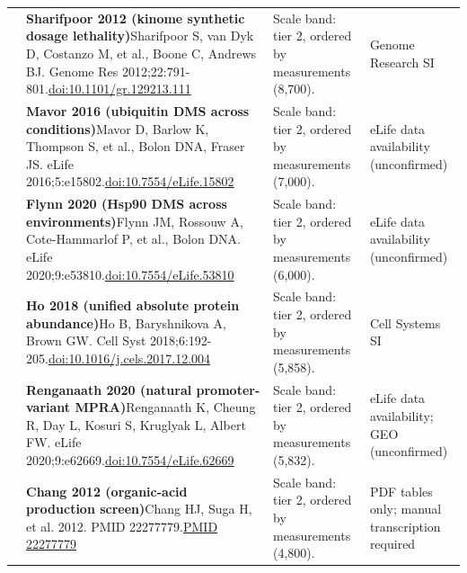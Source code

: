\begin{landscape}
\begin{longtable}{@{}r@{\hspace{4pt}} L{86mm} L{92mm} L{62mm}@{}}
 & \textbf{Sharifpoor 2012 (kinome synthetic dosage lethality)}\newline Sharifpoor S, van Dyk D, Costanzo M, et al., Boone C, Andrews BJ. Genome Res 2012;22:791-801.\newline \href{https://doi.org/10.1101/gr.129213.111}{doi:10.1101/\allowbreak gr.129213.111} & Scale band: tier 2, ordered by measurements (8,700). & Genome Research SI \\
 & \textbf{Mavor 2016 (ubiquitin DMS across conditions)}\newline Mavor D, Barlow K, Thompson S, et al., Bolon DNA, Fraser JS. eLife 2016;5:e15802.\newline \href{https://doi.org/10.7554/eLife.15802}{doi:10.7554/\allowbreak eLife.15802} & Scale band: tier 2, ordered by measurements (7,000). & eLife data availability (unconfirmed) \\
 & \textbf{Flynn 2020 (Hsp90 DMS across environments)}\newline Flynn JM, Rossouw A, Cote-Hammarlof P, et al., Bolon DNA. eLife 2020;9:e53810.\newline \href{https://doi.org/10.7554/eLife.53810}{doi:10.7554/\allowbreak eLife.53810} & Scale band: tier 2, ordered by measurements (6,000). & eLife data availability (unconfirmed) \\
 & \textbf{Ho 2018 (unified absolute protein abundance)}\newline Ho B, Baryshnikova A, Brown GW. Cell Syst 2018;6:192-205.\newline \href{https://doi.org/10.1016/j.cels.2017.12.004}{doi:10.1016/\allowbreak j.cels.2017.12.004} & Scale band: tier 2, ordered by measurements (5,858). & Cell Systems SI \\
 & \textbf{Renganaath 2020 (natural promoter-variant MPRA)}\newline Renganaath K, Cheung R, Day L, Kosuri S, Kruglyak L, Albert FW. eLife 2020;9:e62669.\newline \href{https://doi.org/10.7554/eLife.62669}{doi:10.7554/\allowbreak eLife.62669} & Scale band: tier 2, ordered by measurements (5,832). & eLife data availability; GEO (unconfirmed) \\
 & \textbf{Chang 2012 (organic-acid production screen)}\newline Chang HJ, Suga H, et al. 2012. PMID 22277779.\newline \href{https://pubmed.ncbi.nlm.nih.gov/22277779/}{PMID 22277779} & Scale band: tier 2, ordered by measurements (4,800). & PDF tables only; manual transcription required \\

\end{longtable}
\end{landscape}
